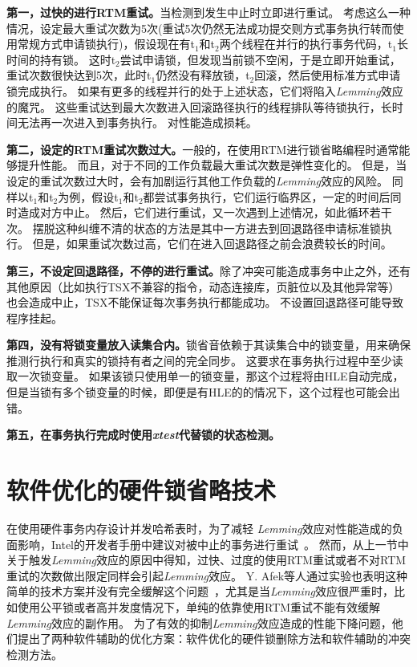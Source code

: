 \textbf{第一，过快的进行RTM重试。}当检测到发生中止时立即进行重试。
考虑这么一种情况，设定最大重试次数为5次(重试5次仍然无法成功提交则方式事务执行转而使用常规方式申请锁执行)，假设现在有t$_1$和t$_2$两个线程在并行的执行事务代码，t$_1$长时间的持有锁。
这时t$_2$尝试申请锁，但发现当前锁不空闲，于是立即开始重试，重试次数很快达到5次，此时t$_1$仍然没有释放锁，t$_2$回滚，然后使用标准方式申请锁完成执行。
如果有更多的线程并行的处于上述状态，它们将陷入\textit{Lemming}效应的魔咒。
这些重试达到最大次数进入回滚路径执行的线程排队等待锁执行，长时间无法再一次进入到事务执行。
对性能造成损耗。

\textbf{第二，设定的RTM重试次数过大。}一般的，在使用RTM进行锁省略编程时通常能够提升性能。
而且，对于不同的工作负载最大重试次数是弹性变化的。
但是，当设定的重试次数过大时，会有加剧运行其他工作负载的\textit{Lemming}效应的风险。
同样以t$_1$和t$_2$为例，假设t$_1$和t$_2$都尝试事务执行，它们运行临界区，一定的时间后同时造成对方中止。
然后，它们进行重试，又一次遇到上述情况，如此循环若干次。
摆脱这种纠缠不清的状态的方法是其中一方进去到回退路径申请标准锁执行。
但是，如果重试次数过高，它们在进入回退路径之前会浪费较长的时间。

\textbf{第三，不设定回退路径，不停的进行重试。}除了冲突可能造成事务中止之外，还有其他原因（比如执行TSX不兼容的指令，动态连接库，页脏位以及其他异常等）也会造成中止，TSX不能保证每次事务执行都能成功。
不设置回退路径可能导致程序挂起。

\textbf{第四，没有将锁变量放入读集合内。}锁省音依赖于其读集合中的锁变量，用来确保推测行执行和真实的锁持有者之间的完全同步。
这要求在事务执行过程中至少读取一次锁变量。
如果该锁只使用单一的锁变量，那这个过程将由HLE自动完成，但是当锁有多个锁变量的时候，即便是有HLE的的情况下，这个过程也可能会出错。

\textbf{第五，在事务执行完成时使用\textit{xtest}代替锁的状态检测。}

\section{软件优化的硬件锁省略技术}

在使用硬件事务内存设计并发哈希表时，为了减轻
\textit{Lemming}效应对性能造成的负面影响，Intel的开发者手册中建议对被中止的事务进行重试~\cite{Intel2015Intel}。
然而，从上一节中关于触发\textit{Lemming}效应的原因中得知，过快、过度的使用RTM重试或者不对RTM重试的次数做出限定同样会引起\textit{Lemming}效应。
Y. Afek等人通过实验也表明这种简单的技术方案并没有完全缓解这个问题~\cite{Afek2014Software}，尤其是当\textit{Lemming}效应很严重时，比如使用公平锁或者高并发度情况下，单纯的依靠使用RTM重试不能有效缓解\textit{Lemming}效应的副作用。
为了有效的抑制\textit{Lemming}效应造成的性能下降问题，他们提出了两种软件辅助的优化方案：软件优化的硬件锁删除方法和软件辅助的冲突检测方法。


